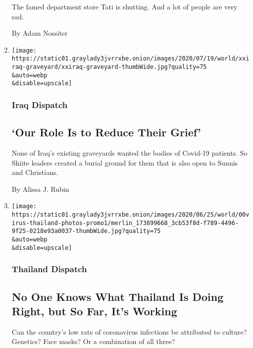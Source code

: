 \begin{enumerate}
  The famed department store Tati is shutting. And a lot of people are
  very sad.

  By Adam Nossiter
\item
  \href{/2020/07/18/world/middleeast/iraq-coronovirus-cemetery.html}{}

  \texttt{[image: https://static01.graylady3jvrrxbe.onion/images/2020/07/19/world/xxiraq-graveyard/xxiraq-graveyard-thumbWide.jpg?quality=75\\\&auto=webp\\\&disable=upscale]}

  \hypertarget{iraq-dispatch}{%
  \subsubsection{Iraq Dispatch}\label{iraq-dispatch}}

  \hypertarget{our-role-is-to-reduce-their-grief}{%
  \subsection{`Our Role Is to Reduce Their
  Grief'}\label{our-role-is-to-reduce-their-grief}}

  None of Iraq's existing graveyards wanted the bodies of Covid-19
  patients. So Shiite leaders created a burial ground for them that is
  also open to Sunnis and Christians.

  By Alissa J. Rubin
\item
  \href{/2020/07/16/world/asia/coronavirus-thailand-photos.html}{}

  \texttt{[image: https://static01.graylady3jvrrxbe.onion/images/2020/06/25/world/00virus-thailand-photos-promo1/merlin\_173899668\_3cb53f8d-f789-4496-9f25-0218e93a0037-thumbWide.jpg?quality=75\\\&auto=webp\\\&disable=upscale]}

  \hypertarget{thailand-dispatch-1}{%
  \subsubsection{Thailand Dispatch}\label{thailand-dispatch-1}}

  \hypertarget{no-one-knows-what-thailand-is-doing-right-but-so-far-its-working}{%
  \subsection{No One Knows What Thailand Is Doing Right, but So Far,
  It's
  Working}\label{no-one-knows-what-thailand-is-doing-right-but-so-far-its-working}}

  Can the country's low rate of coronavirus infections be attributed to
  culture? Genetics? Face masks? Or a combination of all three?


\end{enumerate}
